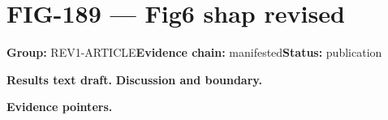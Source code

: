 \clearpage
\section{FIG-189 --- Fig6 shap revised}
\label{figpage:fig-189}
\textbf{Group:} REV1-ARTICLE\quad \textbf{Evidence chain:} manifested\quad \textbf{Status:} publication

\textbf{Results text draft.} 
\textbf{Discussion and boundary.} 


\textbf{Evidence pointers.}



\vfill
